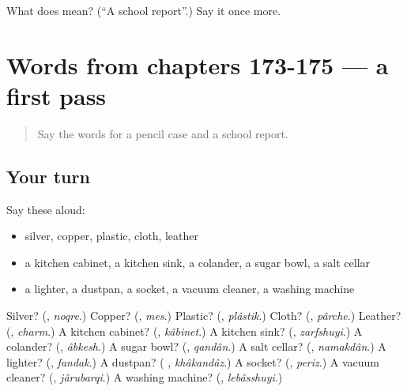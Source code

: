 \begin{tcolorbox}[breakable,colback=teal!4,colframe=teal!35!black,title={Before you move on}]
What does  mean? (\textquotedblleft{}A school report\textquotedblright{}.) Say it once more.
\end{tcolorbox}
\section[(dialogue)]{Words from chapters 173-175 — a first pass}

\label{lesson:FA-R178-first-pass-words-from-chapters-173-175}



\begin{quote}
Say the words for a pencil case and a school report.
\end{quote}

\subsection*{Your turn}
Say these aloud:

\begin{itemize}
\raggedright
  \item silver, copper, plastic, cloth, leather
  \item a kitchen cabinet, a kitchen sink, a colander, a sugar bowl, a salt cellar
  \item a lighter, a dustpan, a socket, a vacuum cleaner, a washing machine
\end{itemize}

\begin{tcolorbox}[breakable,colback=teal!4,colframe=teal!35!black,title={Before you move on}]
Silver? (\textbf{}, \emph{noqre}.) Copper? (\textbf{}, \emph{mes}.) Plastic? (\textbf{}, \emph{plâstik}.) Cloth? (\textbf{}, \emph{pârche}.) Leather? (\textbf{}, \emph{charm}.) A kitchen cabinet? (\textbf{}, \emph{kâbinet}.) A kitchen sink? (\textbf{}, \emph{zarfshuyi}.) A colander? (\textbf{}, \emph{âbkesh}.) A sugar bowl? (\textbf{}, \emph{qandân}.) A salt cellar? (\textbf{}, \emph{namakdân}.) A lighter? (\textbf{}, \emph{fandak}.) A dustpan? (\textbf{ }, \emph{khâkandâz}.) A socket? (\textbf{}, \emph{periz}.) A vacuum cleaner? (\textbf{}, \emph{jârubarqi}.) A washing machine? (\textbf{}, \emph{lebâsshuyi}.)
\end{tcolorbox}
